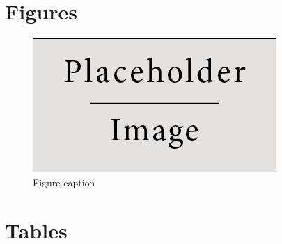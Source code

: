 
    







\newpage
\section*{Figures}

\begin{figure}[ht!]
\centering\includegraphics[width=0.4\linewidth]{figures/placeholder}
\caption{Figure caption}
\end{figure}



\newpage
\section*{Tables}

